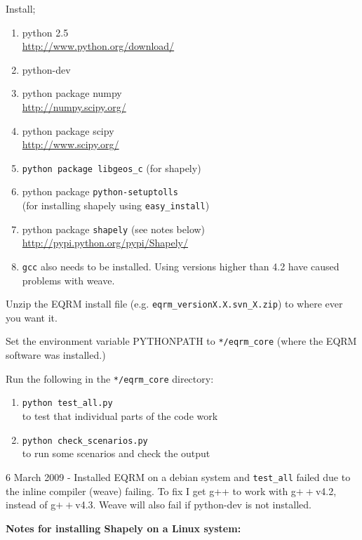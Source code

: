 \documentclass[a4paper, 12pt]{article}
\begin{document}
Install;
\begin{enumerate}
\item python 2.5 \\
\url{http://www.python.org/download/}
\item python-dev
\item python package numpy \\
\url{http://numpy.scipy.org/}
\item python package scipy \\
\url{http://www.scipy.org/}
\item \texttt{python package libgeos\_c} (for shapely)
\item python package \texttt{python-setuptolls} \\
(for installing shapely using \texttt{easy\_install})
\item python package \texttt{shapely}  (see notes below) \\
\url{http://pypi.python.org/pypi/Shapely/}
\item \texttt{gcc} also needs to be installed. Using versions higher than 4.2
have caused problems with weave.
\end{enumerate}

Unzip the EQRM install file (e.g.
\texttt{eqrm\_versionX.X.svn\_X.zip}) to where ever you want it.

Set the environment variable PYTHONPATH to \texttt{*/eqrm\_core}
(where the EQRM software was installed.)

Run the following in the \texttt{*/eqrm\_core} directory:
\begin{enumerate}
\item \texttt{python test\_all.py} \\
to test that individual parts of the code work
\item \texttt{python check\_scenarios.py} \\
to run some scenarios and check the output
\end{enumerate}

6 March 2009 - Installed EQRM on a debian system and
\texttt{test\_all} failed due to the inline compiler (weave)
failing.  To fix I get g++ to work with g$++$v4.2, instead of
g$++$v4.3.  Weave will also fail if python-dev is not installed.


\textbf{Notes for installing Shapely on a Linux system:} \\
\end{document}
